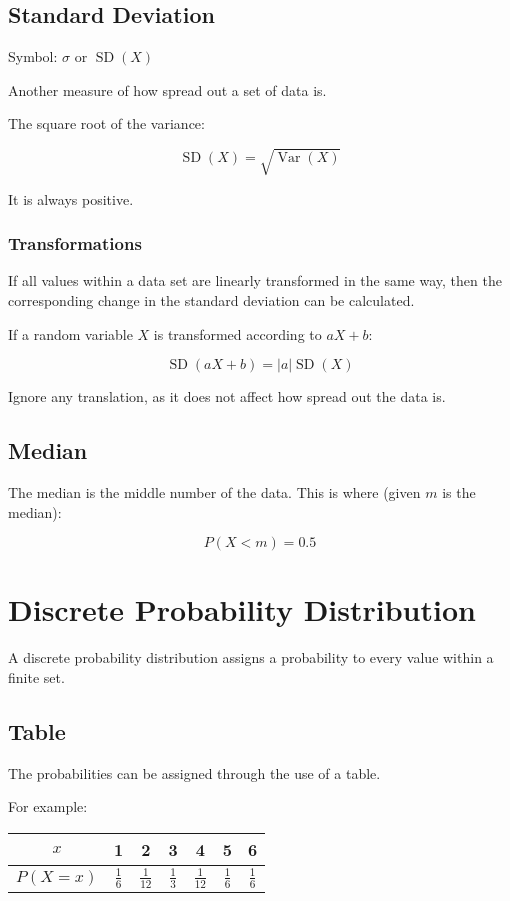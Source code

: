 \documentclass[a4paper,11pt]{article}
\DeclareMathOperator\Var{Var}
\DeclareMathOperator\SD{SD}
\begin{document}
\subsection{Standard Deviation}

Symbol: $\sigma$ or $\SD(X)$

Another measure of how spread out a set of data is.

The square root of the variance:

$$
\SD(X) = \sqrt{\Var(X)}
$$

It is always positive.


\subsubsection{Transformations}

If all values within a data set are linearly transformed in the same way, then
the corresponding change in the standard deviation can be calculated.

If a random variable $X$ is transformed according to $aX + b$:

$$
\SD(aX + b) = |a| \SD(X)
$$

Ignore any translation, as it does not affect how spread out the data is.


\subsection{Median}

The median is the middle number of the data. This is where (given $m$ is the
median):

$$
P(X < m) = 0.5
$$




\section{Discrete Probability Distribution}

A discrete probability distribution assigns a probability to every value within
a finite set.


\subsection{Table}

The probabilities can be assigned through the use of a table.

For example:

\begin{center}
\begin{tabular}{c|c|c|c|c|c|c}
$x$ & 1 & 2 & 3 & 4 & 5 & 6 \\
\hline
$P(X = x)$ & $\frac{1}{6}$ & $\frac{1}{12}$ & $\frac{1}{3}$ & $\frac{1}{12}$ & $\frac{1}{6}$ & $\frac{1}{6}$ \\
\end{tabular}
\end{center}
\end{document}
